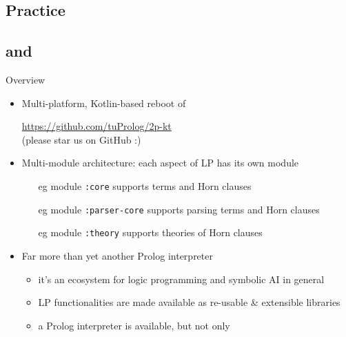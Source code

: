 \documentclass[presentation]{beamer}\mode<presentation>{\usetheme{AMSBolognaFC}}
\begin{document}
\subsection{Practice}

\subsection{\tuprolog{} and \twopkt{}}

\begin{frame}{\twopkt{} Overview}
\label{slide:tuprolog-overview}
    \begin{itemize}
        \item Multi-platform, Kotlin-based reboot of \tuprolog{}
        \begin{center}
            \alert{\url{https://github.com/tuProlog/2p-kt}}
            \\
            \small(please star us on GitHub :)
        \end{center}

        \vfill

        \item Multi-module architecture: each aspect of LP has its own module
        \begin{itemize}
            \item[eg] module \texttt{:core} supports \alert{terms and Horn clauses}
            \item[eg] module \texttt{:parser-core} supports \alert{parsing} terms and Horn clauses
            \item[eg] module \texttt{:theory} supports \alert{theories} of Horn clauses
        \end{itemize}

        \vfill

        \item Far more than yet another Prolog interpreter
        \begin{itemize}
            \item it's an \alert{ecosystem} for logic programming and symbolic AI in general
            \item LP functionalities are made available as re-usable \& extensible \alert{libraries}
            \item a Prolog interpreter is available, but not only
        \end{itemize}

    \end{itemize}
\end{frame}
\end{document}
